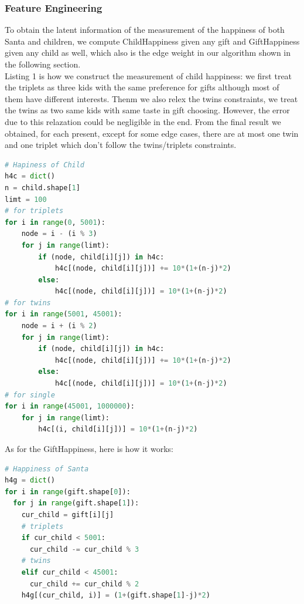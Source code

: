 \documentclass[12pt]{article}
\begin{document}
\subsubsection{Feature Engineering}
To obtain the latent information of the measurement of the happiness of both Santa and children, we compute ChildHappiness given any gift and GiftHappiness given any child as well, which also is the edge weight in our algorithm shown in the following section.\\
Listing 1 is how we construct the measurement of child happiness: we first treat the triplets as three kids with the same preference for gifts although most of them have different interests. Thenm we also relex the twins constraints, we treat the twins as two same kids with same taste in gift choosing. However, the error due to this relazation could be negligible in the end. From the final result we obtained, for each present, except for some edge cases, there are at most one twin and one triplet which don't follow the twins/triplets constraints.

\begin{lstlisting}[language = Python, caption = ChildHappiness]
# Hapiness of Child
h4c = dict()
n = child.shape[1]
limt = 100
# for triplets
for i in range(0, 5001):
    node = i - (i % 3)
    for j in range(limt):
        if (node, child[i][j]) in h4c:
            h4c[(node, child[i][j])] += 10*(1+(n-j)*2)
        else:
            h4c[(node, child[i][j])] = 10*(1+(n-j)*2)
# for twins
for i in range(5001, 45001):
    node = i + (i % 2)
    for j in range(limt):
        if (node, child[i][j]) in h4c:
            h4c[(node, child[i][j])] += 10*(1+(n-j)*2)
        else:
            h4c[(node, child[i][j])] = 10*(1+(n-j)*2)
# for single
for i in range(45001, 1000000):
    for j in range(limt):
        h4c[(i, child[i][j])] = 10*(1+(n-j)*2)
\end{lstlisting}

As for the GiftHappiness, here is how it works:
\begin{lstlisting}[language = Python, caption = GiftHappiness]
# Happiness of Santa
h4g = dict()
for i in range(gift.shape[0]):
  for j in range(gift.shape[1]):
    cur_child = gift[i][j]
    # triplets
    if cur_child < 5001:
      cur_child -= cur_child % 3
    # twins
    elif cur_child < 45001:
      cur_child += cur_child % 2
    h4g[(cur_child, i)] = (1+(gift.shape[1]-j)*2)
\end{lstlisting}
\end{document}
